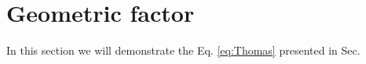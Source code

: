 \section{Geometric factor}
\label{app:G}
In this section we will demonstrate the Eq. \eqref{eq:Thomas} presented in Sec.